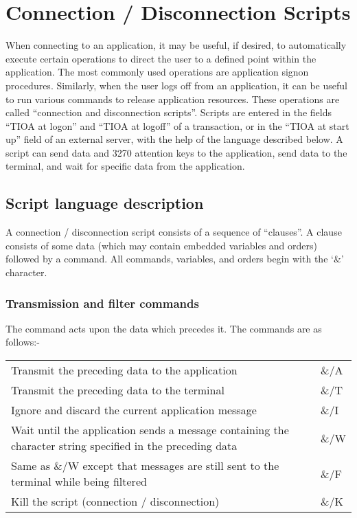 \documentclass[letterpaper,10pt,english]{sphinxmanual}
\begin{document}
\chapter{Connection / Disconnection Scripts}
\label{\detokenize{connectivity_guide:connection-disconnection-scripts}}
When connecting to an application, it may be useful, if desired, to automatically execute certain operations to direct the user to a defined point within the application. The most commonly used operations are application signon procedures. Similarly, when the user logs off from an application, it can be useful to run various commands to release application resources. These operations are called “connection and disconnection scripts”. Scripts are entered in the fields “TIOA at logon” and “TIOA at logoff” of a transaction, or in the “TIOA at start up” field of an external server, with the help of the language described below. A script can send data and 3270 attention keys to the application, send data to the terminal, and wait for specific data from the application.


\section{Script language description}
\label{\detokenize{connectivity_guide:script-language-description}}
A connection / disconnection script consists of a sequence of “clauses”. A clause consists of some data (which may contain embedded variables and orders) followed by a command. All commands, variables, and orders begin with the ‘\&’ character.


\subsection{Transmission and filter commands}
\label{\detokenize{connectivity_guide:transmission-and-filter-commands}}
The command acts upon the data which precedes it. The commands are as follows:-


\begin{savenotes}\sphinxattablestart
\centering
\begin{tabulary}{\linewidth}[t]{|T|T|}
\hline
{}\relax &\relax \\
\hline
Transmit the preceding data to the application
&
\&/A
\\
\hline
Transmit the preceding data to the terminal
&
\&/T
\\
\hline
Ignore and discard the current application message
&
\&/I
\\
\hline
Wait until the application sends a message containing the character string specified in the preceding data
&
\&/W
\\
\hline
Same as \&/W except that messages are still sent to the terminal while being filtered
&
\&/F
\\
\hline
Kill the script (connection / disconnection)
&
\&/K
\\
\hline
\end{tabulary}
\par
\sphinxattableend\end{savenotes}
\end{document}
